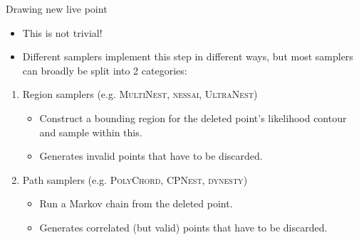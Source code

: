 \documentclass[aspectratio=169, 11pt]{beamer}
\begin{document}

\begin{frame}{Drawing new live point}
\begin{itemize}
    \item This is not trivial!
    \item Different samplers implement this step in different ways, but most samplers can broadly be split into 2 categories:
\end{itemize}
\begin{enumerate}
    \item Region samplers (e.g. \textsc{MultiNest}, \textsc{nessai}, \textsc{UltraNest})
    \begin{itemize}
        \item Construct a bounding region for the deleted point's likelihood contour and sample within this.
        \item Generates invalid points that have to be discarded.
    \end{itemize}
    \item Path samplers (e.g. \textsc{PolyChord}, \textsc{CPNest}, \textsc{dynesty})
    \begin{itemize}
        \item Run a Markov chain from the deleted point.
        \item Generates correlated (but valid) points that have to be discarded.
    \end{itemize}
\end{enumerate}
\end{frame}
\end{document}
